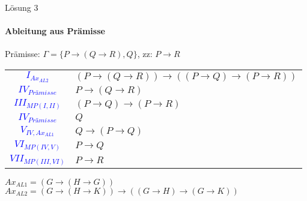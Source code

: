 \begin{frame}{Lösung 3}
	\framesubtitle{Ableitung aus Prämisse}
	Prämisse: $\Gamma =\{P\rightarrow(Q\rightarrow R), Q\}$, zz: $P\rightarrow R$\\
	\begin{tabular}{cl}
		\textcolor{blue}{$I_{Ax_{AL2}}$}           & $(P\rightarrow(Q\rightarrow R))\rightarrow((P\rightarrow Q)\rightarrow(P\rightarrow R))$ \\
		\textcolor{blue}{$IV_{\textit{Prämisse}}$} & $P\rightarrow(Q\rightarrow R)$                                                           \\
		\textcolor{blue}{$III_{MP(I, II)}$}        & $(P\rightarrow Q)\rightarrow(P\rightarrow R)$                                            \\
		\textcolor{blue}{$IV_{\textit{Prämisse}}$} & $Q$                                                                                      \\
		\textcolor{blue}{$V_{IV, Ax_{AL1}}$}       & $Q\rightarrow(P\rightarrow Q)$                                                           \\
		\textcolor{blue}{$VI_{MP(IV, V)}$}         & $P\rightarrow Q$                                                                         \\
		\textcolor{blue}{$VII_{MP(III, VI)}$}      & $P\rightarrow R$                                                                         \\
	\end{tabular}
	$Ax_{AL1} = (G\rightarrow(H\rightarrow G))$\\
	$Ax_{AL2} = (G\rightarrow(H\rightarrow K))\rightarrow((G\rightarrow H)\rightarrow(G\rightarrow K))$\\
\end{frame}
